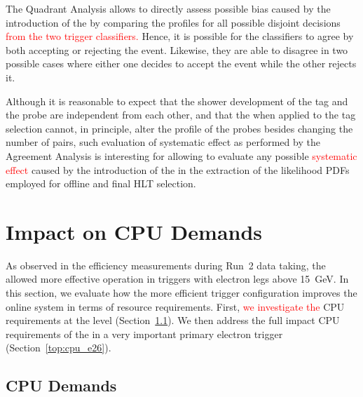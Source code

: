 The Quadrant Analysis allows to directly assess possible bias caused by the
introduction of the \rnn{} by comparing the profiles for all possible disjoint
decisions \textcolor{red}{from the two trigger classifiers.} Hence, it is possible for the classifiers
to agree by both accepting or rejecting the event. Likewise, they are able to
disagree in two possible cases where either one decides to accept the event
while the other rejects it.

Although it is reasonable to expect that the shower development of the tag and
the probe are independent from each other, and that the \rnn{} when applied to
the tag selection cannot, in principle, alter the profile of the probes besides
changing the number of \tnp{} pairs, such evaluation of systematic effect as
performed by the Agreement Analysis is interesting for allowing to evaluate any
possible \textcolor{red}{systematic effect} caused by the introduction of the \rnn{} in the extraction of the
likelihood PDFs employed for offline and final HLT selection.

\FloatBarrier
\section{Impact on CPU Demands} %

As observed in the efficiency measurements during Run~2 data taking, the \rnn{}
allowed more effective \fastcalo{} operation in triggers with electron legs
above \SI{15}{\GeV}. In this section, we evaluate how the more efficient trigger
configuration improves the online system in terms of resource requirements.
First, \textcolor{red}{we investigate the} CPU requirements at the \fastcalo{}
level (Section~\ref{top:fastcalo_cpu}). We then address the full impact CPU
requirements of the \rnn{} in a very important primary electron trigger
(Section~\ref{top:cpu_e26}).

\subsection{\fastcalo{} CPU Demands}\label{top:fastcalo_cpu}


